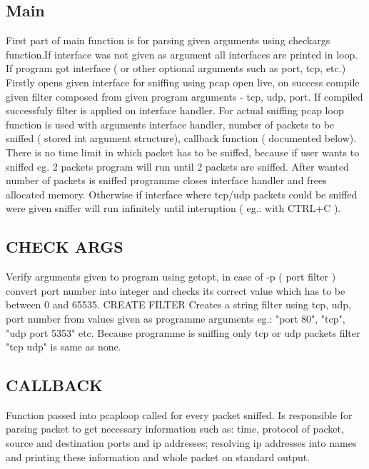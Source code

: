 \documentclass{article}
\begin{document}
\subsection{Main}
First part of main function is for parsing given arguments using check\textunderscore args function.If interface was not given as argument all interfaces are printed in loop.
	If program got interface ( or other optional arguments such as port, tcp, etc.) 
	Firstly opens given interface for sniffing using pcap \textunderscore open \textunderscore live, on success compile given filter composed from given program arguments - tcp, udp, port. If compiled successfuly filter is applied on interface handler.
	For actual sniffing pcap \textunderscore loop function is used with arguments interface handler, number of packets to be sniffed ( stored int argument structure), callback function ( documented below). There is no time limit in which packet has to be sniffed, because if user wants to sniffed eg. 2 packets program will run until 2 packets are sniffed.  After wanted number of packets is sniffed programme closes interface handler and frees allocated memory. Otherwise if interface where tcp/udp packets could be sniffed were given sniffer will run infinitely until interuption ( eg.: with CTRL+C ).\newline
\subsection{CHECK \textunderscore ARGS}
Verify arguments given to program using getopt, in case of -p ( port filter ) convert port number into integer and checks its correct value which has to be between 0 and 65535. \newline
CREATE \textunderscore FILTER
Creates a string filter using tcp, udp, port number from values given as programme arguments eg.: "port 80", "tcp", "udp port 5353" etc. Because programme is sniffing only tcp or udp packets filter "tcp udp" is same as none.\newline

\subsection{CALLBACK}
Function passed into pcaploop called for every packet sniffed. Is responsible for parsing packet to get necessary information such as: time, protocol of packet, source and destination ports and ip addresses; resolving ip addresses into names and printing these information and whole packet on standard output.
\end{document}
